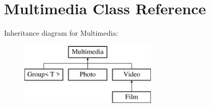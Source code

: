 \hypertarget{class_multimedia}{\section{Multimedia Class Reference}
\label{class_multimedia}
}
Inheritance diagram for Multimedia\-:\begin{figure}[H]
\begin{center}
\leavevmode
\includegraphics[height=3.000000cm]{class_multimedia}
\end{center}
\end{figure}
